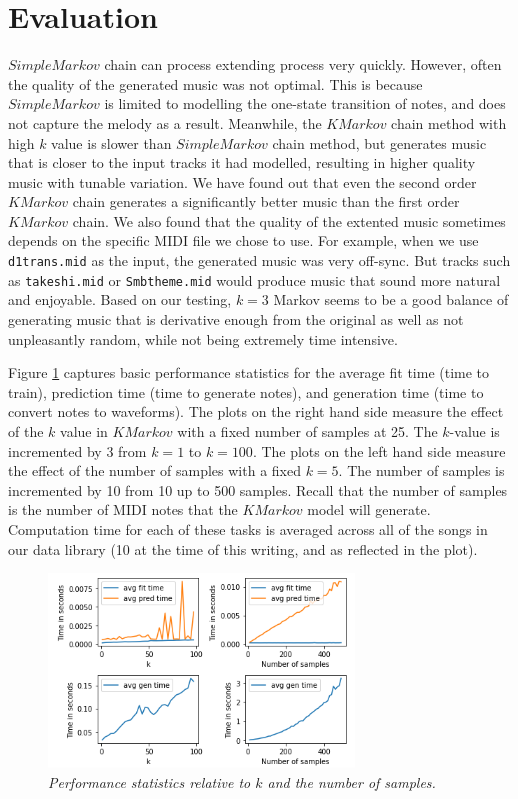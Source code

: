 \documentclass{article}
\begin{document}
\section{Evaluation}
$SimpleMarkov$ chain can process extending process very quickly. However, often the quality of the generated music was not optimal. This is because $SimpleMarkov$ is limited to 
modelling the one-state transition of notes, and does not capture the melody as a result. 
Meanwhile, the $KMarkov$ chain method with high $k$ value is slower than $SimpleMarkov$ chain method, but generates music that is closer to the input tracks it had modelled, 
resulting in higher quality music with tunable variation. We have found out that even the second order $KMarkov$ chain generates a significantly better music than the first 
order $KMarkov$ chain. We also found that the quality of the extented music sometimes depends on the specific MIDI file we chose to use.
For example, when we use \texttt{d1trans.mid} as the input, the generated music was very off-sync. But tracks such as \texttt{takeshi.mid} or \texttt{Smbtheme.mid} would 
produce music that sound more natural and enjoyable. Based on our testing, $k=3$ Markov seems to be a good balance of generating music that is derivative enough from the 
original as well as not unpleasantly random, while not being extremely time intensive.

Figure \ref{fig:stats} captures basic performance statistics for the average fit time (time to train), prediction time (time to generate notes), and 
generation time (time to convert notes to waveforms). The plots on the right hand side measure the effect of the $k$ value in $KMarkov$ with a fixed number of samples at 25. 
The $k$-value is incremented by 3 from $k=1$ to $k=100$. The plots on the left hand side measure the effect of the number of samples with a fixed $k=5$. The number of samples 
is incremented by 10 from 10 up to 500 samples. Recall that the number of samples is the number of MIDI notes that the $KMarkov$ model will generate. Computation time for 
each of these tasks is averaged across all of the songs in our data library (10 at the time of this writing, and as reflected in the plot).

\begin{figure} 
\includegraphics[width=230pt]{figs/stats.png} 
\caption{\small \sl Performance statistics relative to $k$ and the number of samples.\label{fig:stats}} 
\end{figure}
\end{document}
